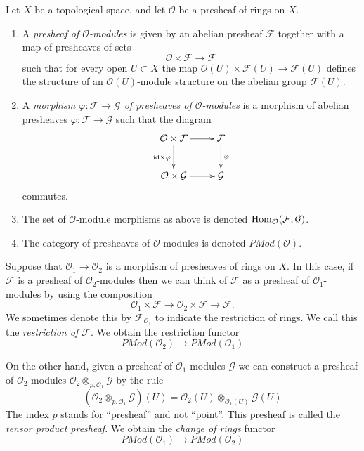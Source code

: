 \begin{definition}
\label{definition-presheaf-modules}
Let $X$ be a topological space, and let $\mathcal{O}$ be
a presheaf of rings on $X$.
\begin{enumerate}
\item A {\it presheaf of $\mathcal{O}$-modules}
is given by an abelian presheaf $\mathcal{F}$ together with a
map of presheaves of sets
$$
\mathcal{O} \times \mathcal{F} \longrightarrow \mathcal{F}
$$
such that for every open $U \subset X$ the map
$\mathcal{O}(U) \times \mathcal{F}(U) \to \mathcal{F}(U)$
defines the structure of an $\mathcal{O}(U)$-module
structure on the abelian group $\mathcal{F}(U)$.
\item A {\it morphism $\varphi : \mathcal{F} \to \mathcal{G}$
of presheaves of $\mathcal{O}$-modules} is a morphism of abelian presheaves
$\varphi : \mathcal{F} \to \mathcal{G}$ such that
the diagram
$$
\xymatrix{
\mathcal{O} \times \mathcal{F} \ar[r] \ar[d]_{\text{id} \times \varphi} &
\mathcal{F} \ar[d]^{\varphi} \\
\mathcal{O} \times \mathcal{G} \ar[r] &
\mathcal{G}
}
$$
commutes.
\item The set of $\mathcal{O}$-module morphisms as above is
denoted $\mathop{\mathrm{Hom}}\nolimits_\mathcal{O}(\mathcal{F}, \mathcal{G})$.
\item The category of presheaves of $\mathcal{O}$-modules
is denoted $\textit{PMod}(\mathcal{O})$.
\end{enumerate}
\end{definition}

\noindent
Suppose that $\mathcal{O}_1 \to \mathcal{O}_2$ is a
morphism of presheaves of rings on $X$. In this case,
if $\mathcal{F}$ is a presheaf of $\mathcal{O}_2$-modules
then we can think of $\mathcal{F}$ as a presheaf of
$\mathcal{O}_1$-modules by using the composition
$$
\mathcal{O}_1 \times \mathcal{F}
\to
\mathcal{O}_2 \times \mathcal{F}
\to
\mathcal{F}.
$$
We sometimes denote this by $\mathcal{F}_{\mathcal{O}_1}$
to indicate the restriction of rings. We call this
the {\it restriction of $\mathcal{F}$}. We obtain the
restriction functor
$$
\textit{PMod}(\mathcal{O}_2)
\longrightarrow
\textit{PMod}(\mathcal{O}_1)
$$

\medskip\noindent
On the other hand, given a presheaf of $\mathcal{O}_1$-modules
$\mathcal{G}$
we can construct a presheaf of $\mathcal{O}_2$-modules
$\mathcal{O}_2 \otimes_{p, \mathcal{O}_1} \mathcal{G}$
by the rule
$$
\left(\mathcal{O}_2 \otimes_{p, \mathcal{O}_1} \mathcal{G}\right)(U)
=
\mathcal{O}_2(U) \otimes_{\mathcal{O}_1(U)} \mathcal{G}(U)
$$
The index $p$ stands for ``presheaf'' and not ``point''.
This presheaf is called the {\it tensor product presheaf}. We obtain
the {\it change of rings} functor
$$
\textit{PMod}(\mathcal{O}_1)
\longrightarrow
\textit{PMod}(\mathcal{O}_2)
$$

